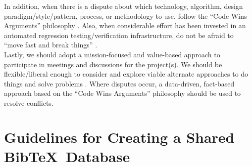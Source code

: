 \documentclass[letter,12pt]{article}
\begin{document}

In addition, when there is a dispute about which technology, algorithm, design paradigm/style/pattern, process, or methodology to use, follow the ``Code Wins Arguments'' philosophy \cite{Kushner2011,Zuckerberg2012}. Also, when considerable effort has been invested in an automated regression testing/verification infrastructure, do not be afraid to ``move fast and break things'' \cite{Fong2011,Evangelista2012}. \\

Lastly, we should adopt a mission-focused and value-based approach to participate in meetings and discussions for the project(s). We should be flexible/liberal enough to consider and explore viable alternate approaches to do things and solve problems \cite{Beedle2001,Beedle2001a}. Where disputes occur, a data-driven, fact-based approach based on the ``Code Wins Arguments'' philosophy should be used to resolve conflicts.

\section{Guidelines for Creating a Shared {\sc Bib}\TeX\ Database}
\label{sec:GuidelinesforCreatingaSharedBibTeXDatabase}
\end{document}
